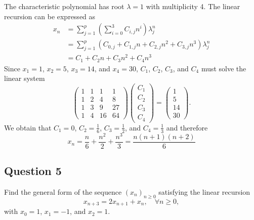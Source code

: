 The characteristic polynomial has root $ \lambda = 1 $ with multiplicity 4.
The linear recursion can be expressed as
\begin{align*}
    x_n
        &= \sum_{j=1}^{p} \left( \sum_{i=0}^{3} C_{i,j} n^i \right)
            \lambda_j^n \\
        &= \sum_{j=1}^{p} \left( C_{0,j} + C_{1,j} n + C_{2,j} n^2 + C_{3,j}
            n^3 \right) \lambda_j^n \\
        &= C_1 + C_2 n + C_3 n^2 + C_4 n^3
\end{align*}
Since $ x_1 = 1 $, $ x_2 = 5 $, $ x_3 = 14 $, and $ x_4 = 30 $, $ C_1 $,
    $ C_2 $, $ C_3 $, and $ C_4 $ must solve the linear system
\begin{equation*}
    \begin{pmatrix}
        1 & 1 & 1 & 1 \\
        1 & 2 & 4 & 8 \\
        1 & 3 & 9 & 27 \\
        1 & 4 & 16 & 64
    \end{pmatrix}
    \begin{pmatrix}
        C_1 \\
        C_2 \\
        C_3 \\
        C_4
    \end{pmatrix}
    =
    \begin{pmatrix}
        1 \\
        5 \\
        14 \\
        30
    \end{pmatrix}.
\end{equation*}
We obtain that $ C_1 = 0 $, $ C_2 = \frac{1}{6} $, $ C_3 = \frac{1}{2} $, and
    $ C_4 = \frac{1}{3} $ and therefore
\begin{equation*}
    x_n = \frac{n}{6} + \frac{n^2}{2} + \frac{n^3}{3} =
        \frac{n (n + 1) (n + 2)}{6}
\end{equation*}

\subsection{Question 5}
Find the general form of the sequence $ (x_n)_{n \geq 0} $ satisfying the
    linear recursion
\begin{equation*}
    x_{n + 3} = 2 x_{n + 1} + x_n, \quad \forall n \geq 0,
\end{equation*}
with $ x_0 = 1 $, $ x_1 = -1 $, and $ x_2 = 1 $.

